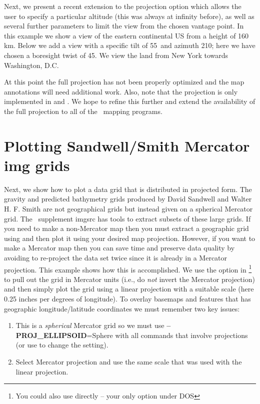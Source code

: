 Next, we present a recent extension to the  projection option which allows the user
to specify a particular altitude (this was always at infinity before), as well as several
further parameters to limit the view from the chosen vantage point.  In this example we show
a view of the eastern continental US from a height of 160 km.  Below we add a view with a specific tilt of
55\DS\ and azimuth 210\DS; here we have chosen a boresight twist of 45\DS.  We view the land from
New York towards Washington, D.C.


At this point the full projection has not been properly optimized and the map annotations will need
additional work.  Also, note that the projection is only implemented in  and .
We hope to refine this further and extend the availability of the full projection to all of the
\GMT\ mapping programs.

 

\section{Plotting Sandwell/Smith Mercator img grids}

Next, we show how to plot a data grid that is distributed in projected form.  The gravity and
predicted bathymetry grids produced by David Sandwell and Walter H. F. Smith are not geographical
grids but instead given on a spherical Mercator grid.  The \GMT\ supplement imgsrc has tools to
extract subsets of these large grids.  If you need to make a non-Mercator map then you must extract
a geographic grid using  and then plot it using your desired map projection.
However, if you want to make a Mercator map then you can save time and preserve data quality by
avoiding to re-project the data set twice since it is already in a Mercator projection.  This example
shows how this is accomplished.  We use the  option in \footnote{You could
also use  directly -- your only option under DOS} to pull out the
grid in Mercator units (i.e., do \emph{not} invert the Mercator projection) and then simply plot the
grid using a linear projection with a suitable scale (here 0.25 inches per degrees of longitude).
To overlay basemaps and features that has geographic longitude/latitude coordinates we must remember
two key issues:
\begin{enumerate}
	\item This is a \emph{spherical} Mercator grid so we must use {\bf --PROJ\_ELLIPSOID}=Sphere with all
	commands that involve projections (or use  to change the setting).
	\item Select Mercator projection and use the same scale that was used with the linear projection.
\end{enumerate}

